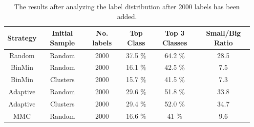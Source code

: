 \begin{table}[h!]
    \centering
    \begin{tabular}{|cccccc|}
        \hline
        \textbf{Strategy} & \textbf{Initial Sample} & \textbf{No. labels} & \textbf{Top Class} & \textbf{Top 3 Classes} & \textbf{Small/Big Ratio}\\
        \hline
        Random & Random & 2000 & 37.5 \% & 64.2 \% & 28.5 \\
        BinMin & Random & 2000 & 16.1 \% & 42.5 \% & 7.5 \\
        BinMin & Clusters & 2000 & 15.7 \% & 41.5 \% & 7.3 \\
        Adaptive & Random & 2000 & 29.6 \% & 51.8 \% & 33.8 \\
        Adaptive & Clusters & 2000 & 29.4 \% & 52.0 \% & 34.7 \\
        MMC & Random & 2000 & 16.6 \% & 41 \% & 9.6 \\
        \hline
    \end{tabular}
    \caption{The results after analyzing the label distribution after 2000 labels has been added.}
    \label{tab:distribution-result-2000}
\end{table}